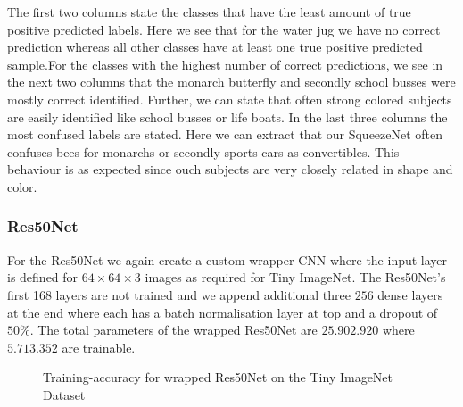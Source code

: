 \documentclass[11pt]{article}
\begin{document}
The first two columns state the classes that have the least amount of true positive predicted labels. Here we see that for the water jug we have no correct prediction whereas all other classes have at least one true positive predicted sample.For the classes with the highest number of correct predictions, we see in the next two columns that the monarch butterfly and secondly school busses were mostly correct identified. Further, we can state that often strong colored subjects are easily identified like school busses or life boats. In the last three columns the most confused labels are stated. Here we can extract that our SqueezeNet often confuses bees for monarchs or secondly sports cars as convertibles. This behaviour is as expected since ouch subjects are very closely related in shape and color.


\subsubsection{Res50Net}
For the Res50Net we again create a custom wrapper CNN where the input layer is defined for $64\times64\times 3$ images as required for Tiny ImageNet. The Res50Net's first 168 layers are not trained and we append additional three $256$ dense layers at the end where each has a batch normalisation layer at top and a dropout of $50\%$. The total parameters of the wrapped Res50Net are $25.902.920$ where $5.713.352$ are trainable.

\begin{figure}
\centering
{}
  \hfill
  \hfill
\caption{Training-accuracy for wrapped Res50Net on the Tiny ImageNet Dataset}
\label{rescnn::8}
\end{figure}
\end{document}

